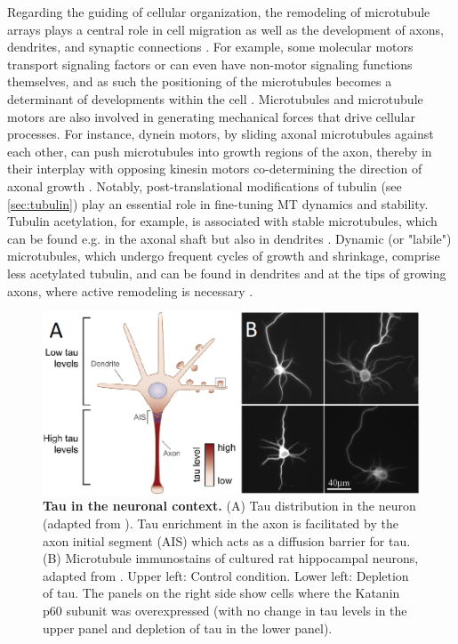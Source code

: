 Regarding the guiding of cellular organization, the remodeling of microtubule arrays plays a central role in cell migration as well as the development of axons, dendrites, and synaptic connections \parencite{Kapitein2015}. For example, some molecular motors transport signaling factors or can even have non-motor signaling functions themselves, and as such the positioning of the microtubules becomes a determinant of developments within the cell \parencite{Hirokawa2010}. Microtubules and microtubule motors are also involved in generating mechanical forces that drive cellular processes. For instance, dynein motors, by sliding axonal microtubules against each other, can push microtubules into growth regions of the axon, thereby in their interplay with opposing kinesin motors co-determining the direction of axonal growth \parencite{Kahn2016}. Notably, post-translational modifications of tubulin (see \autoref{sec:tubulin}) play an essential role in fine-tuning MT dynamics and stability. Tubulin acetylation, for example, is associated with stable microtubules, which can be found e.g. in the axonal shaft but also in dendrites \parencite{Tas2017}. Dynamic (or "labile") microtubules, which undergo frequent cycles of growth and shrinkage, comprise less acetylated tubulin, and can be found in dendrites and at the tips of growing axons, where active remodeling is necessary \parencite{Baas2016, Tas2017}. \par

\begin{figure}[h!tb]
	\centering
	\includegraphics[width=\linewidth]{Figures/neuron.png}
	\caption[Tau in the neuronal context.]{\textbf{Tau in the neuronal context.}
	(A) Tau distribution in the neuron (adapted from \cite{Ittner2018}). Tau enrichment in the axon is facilitated by the axon initial segment (AIS) which acts as a diffusion barrier for tau. (B) Microtubule immunostains of cultured rat hippocampal neurons, adapted from \cite{Qiang2006}. Upper left: Control condition. Lower left: Depletion of tau. The panels on the right side show cells where the Katanin p60 subunit was overexpressed (with no change in tau levels in the upper panel and depletion of tau in the lower panel).
		}\label{neuron}
\end{figure}

